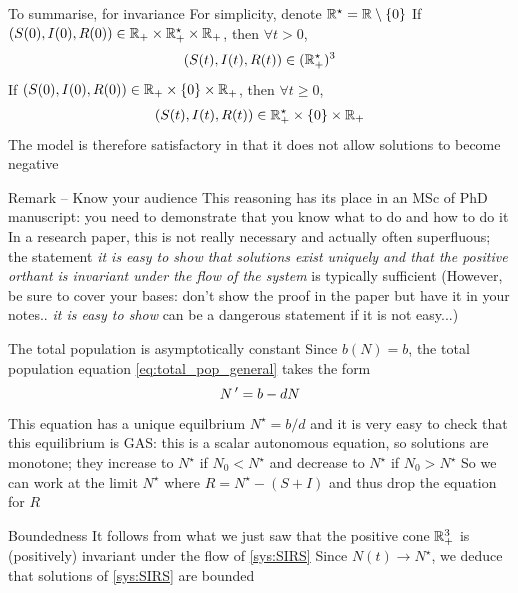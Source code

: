 \documentclass[aspectratio=169]{beamer}\usepackage[]{graphicx}\usepackage[]{xcolor}
\begin{document}
\begin{frame}{To summarise, for invariance}
For simplicity, denote $\mathbb{R}^\star=\mathbb{R}\setminus\{0\}$
\vfill
\bbullet If $(S(0),I(0),R(0))\in\mathbb{R}_+\times \mathbb{R}_+^\star\times\mathbb{R}_+$, then $\forall t>0$,
\[
(S(t),I(t),R(t))\in(\mathbb{R}_+^\star)^3
\]
\vfill
\bbullet If $(S(0),I(0),R(0))\in\mathbb{R}_+\times\{0\}\times\mathbb{R}_+$, then $\forall t\geq 0$, 
\[
(S(t),I(t),R(t))\in\mathbb{R}_+^\star\times\{0\}\times\mathbb{R}_+
\]
\vfill
The model is therefore satisfactory in that it does not allow solutions to become negative
\end{frame}

\begin{frame}{Remark -- Know your audience} 
This reasoning has its place in an MSc of PhD manuscript: you need to demonstrate that you know what to do and how to do it
\vfill
In a research paper, this is not really necessary and actually often superfluous; the statement \emph{it is easy to show that solutions exist uniquely and that the positive orthant is invariant under the flow of the system} is typically sufficient
\vfill
(However, be sure to cover your bases: don't show the proof in the paper but have it in your notes.. \emph{it is easy to show} can be a dangerous statement if it is not easy...)
\end{frame}


\begin{frame}{The total population is asymptotically constant}
Since $b(N)=b$, the total population equation \eqref{eq:total_pop_general} takes the form
\[
N\,' = b-dN
\]
This equation has a unique equilbrium $N^\star=b/d$ and it is very easy to check that this equilibrium is GAS: this is a scalar autonomous equation, so solutions are monotone; they increase to $N^\star$ if $N_0<N^\star$ and decrease to $N^\star$ if $N_0>N^\star$
\vfill
So we can work at the limit $N^\star$ where $R=N^\star-(S+I)$ and thus drop the equation for $R$
\end{frame}


\begin{frame}{Boundedness}
It follows from what we just saw that the positive cone $\mathbb{R}_+^3$ is (positively) invariant under the flow of \eqref{sys:SIRS}
\vfill
Since $N(t)\to N^\star$, we deduce that solutions of \eqref{sys:SIRS} are bounded
\end{frame}
\end{document}
